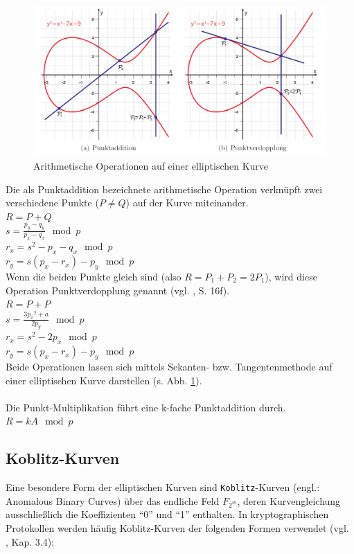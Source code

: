 \begin{figure}[H]
	\centering
	\includegraphics[width=\textwidth]{bilder/p-addition}
	\caption{Arithmetische Operationen auf einer elliptischen Kurve}
	\label{fig:padd}
\end{figure}

Die als Punktaddition bezeichnete arithmetische Operation verknüpft zwei verschiedene Punkte ($P \ne Q$) auf der Kurve miteinander. \\

$R = P + Q$ \\
$s = \frac{p_y-q_y}{p_x-q_x} \mod p$ \\
$r_x = s^2 - p_x - q_x \mod p$ \\
$r_y = s(p_x-r_x)-p_y \mod p$ \\

Wenn die beiden Punkte gleich sind (also $R = P_1 + P_2 = 2 P_1$), wird diese Operation Punktverdopplung genannt (vgl. \cite{puttmann}, S. 16f). \\

$R=P+P$ \\
$s=\frac{3{p_x}^2+a}{2p_y} \mod p$ \\  
$r_x=s^2-2p_x \mod p$ \\  
$r_y=s(p_x-r_x)-p_y \mod p$ \\

Beide Operationen lassen sich mittels Sekanten- bzw. Tangentenmethode auf einer elliptischen Kurve darstellen (s. Abb. \ref{fig:padd}). 
\\ \\
Die Punkt-Multiplikation führt eine k-fache Punktaddition durch. \\

$R = k A \mod p$

\subsection{Koblitz-Kurven}
Eine besondere Form der elliptischen Kurven sind \texttt{Koblitz}-Kurven (engl.: Anomalous Binary Curves) über das endliche Feld $F_{2^m}$, deren Kurvengleichung ausschließlich die Koeffizienten ``0'' und ``1'' enthalten. In kryptographischen Protokollen werden häufig Koblitz-Kurven der folgenden Formen verwendet (vgl. \cite{guide}, Kap. 3.4):

